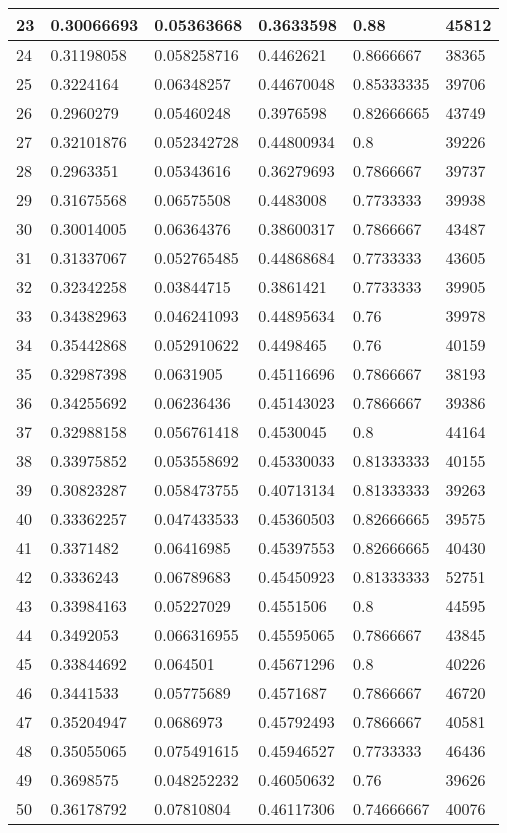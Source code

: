 \begin{longtable}{|l|l|l|l|l|l|}
23 & 0.30066693 & 0.05363668 & 0.3633598 & 0.88 & 45812 \\ \hline 
24 & 0.31198058 & 0.058258716 & 0.4462621 & 0.8666667 & 38365 \\ \hline 
25 & 0.3224164 & 0.06348257 & 0.44670048 & 0.85333335 & 39706 \\ \hline 
26 & 0.2960279 & 0.05460248 & 0.3976598 & 0.82666665 & 43749 \\ \hline 
27 & 0.32101876 & 0.052342728 & 0.44800934 & 0.8 & 39226 \\ \hline 
28 & 0.2963351 & 0.05343616 & 0.36279693 & 0.7866667 & 39737 \\ \hline 
29 & 0.31675568 & 0.06575508 & 0.4483008 & 0.7733333 & 39938 \\ \hline 
30 & 0.30014005 & 0.06364376 & 0.38600317 & 0.7866667 & 43487 \\ \hline 
31 & 0.31337067 & 0.052765485 & 0.44868684 & 0.7733333 & 43605 \\ \hline 
32 & 0.32342258 & 0.03844715 & 0.3861421 & 0.7733333 & 39905 \\ \hline 
33 & 0.34382963 & 0.046241093 & 0.44895634 & 0.76 & 39978 \\ \hline 
34 & 0.35442868 & 0.052910622 & 0.4498465 & 0.76 & 40159 \\ \hline 
35 & 0.32987398 & 0.0631905 & 0.45116696 & 0.7866667 & 38193 \\ \hline 
36 & 0.34255692 & 0.06236436 & 0.45143023 & 0.7866667 & 39386 \\ \hline 
37 & 0.32988158 & 0.056761418 & 0.4530045 & 0.8 & 44164 \\ \hline 
38 & 0.33975852 & 0.053558692 & 0.45330033 & 0.81333333 & 40155 \\ \hline 
39 & 0.30823287 & 0.058473755 & 0.40713134 & 0.81333333 & 39263 \\ \hline 
40 & 0.33362257 & 0.047433533 & 0.45360503 & 0.82666665 & 39575 \\ \hline 
41 & 0.3371482 & 0.06416985 & 0.45397553 & 0.82666665 & 40430 \\ \hline 
42 & 0.3336243 & 0.06789683 & 0.45450923 & 0.81333333 & 52751 \\ \hline 
43 & 0.33984163 & 0.05227029 & 0.4551506 & 0.8 & 44595 \\ \hline 
44 & 0.3492053 & 0.066316955 & 0.45595065 & 0.7866667 & 43845 \\ \hline 
45 & 0.33844692 & 0.064501 & 0.45671296 & 0.8 & 40226 \\ \hline 
46 & 0.3441533 & 0.05775689 & 0.4571687 & 0.7866667 & 46720 \\ \hline 
47 & 0.35204947 & 0.0686973 & 0.45792493 & 0.7866667 & 40581 \\ \hline 
48 & 0.35055065 & 0.075491615 & 0.45946527 & 0.7733333 & 46436 \\ \hline 
49 & 0.3698575 & 0.048252232 & 0.46050632 & 0.76 & 39626 \\ \hline 
50 & 0.36178792 & 0.07810804 & 0.46117306 & 0.74666667 & 40076 \\ \hline 
\end{longtable}